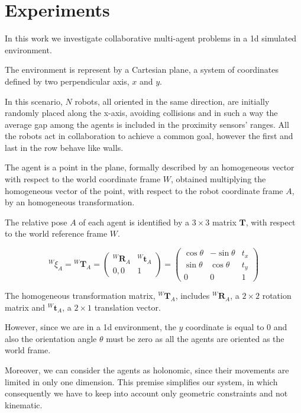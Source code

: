 \chapter{Experiments}
\label{chap:experiments}


In this work we investigate collaborative multi-agent problems in a \gls{1d} 
simulated environment.

The environment is represent by a Cartesian plane, a system of coordinates
defined by two perpendicular axis, $x$ and $y$. 

In this scenario, $N$ robots, all oriented in the same direction, are initially 
randomly placed along the x-axis, avoiding collisions and in such a way the 
average gap among the agents is included in the proximity sensors' ranges. 
All the robots act in collaboration to achieve a common goal, however the first 
and last in the row behave like walls. %

The agent is a point in the plane, formally described by an homogeneous vector 
with respect to the world coordinate frame $W$, obtained multiplying the 
homogeneous vector of the point, with respect to the robot coordinate frame 
$A$, by an homogeneous transformation. 

The relative pose $A$ of each agent is identified by a $3 \times 3$ matrix 
$\mathbf{T}$, with respect to the world reference frame $W$. 

\begin{Equation}[!htb]
	\centering
	\begin{equation}
	\label{eq:homogeneous transformation matrix}
	{^W\!\xi_A} = {^W\!\mathbf{T}_A} 
	=
	\begin{pmatrix}
	^W\!\mathbf{R}_A & ^W\!\mathbf{t}_A\\
	0, 0 & 1
	\end{pmatrix}
	=
	\begin{pmatrix}
	\cos \theta & - \sin \theta & t_x\\
	\sin \theta & \cos \theta & t_y\\
	0 & 0 & 1
	\end{pmatrix}
	\end{equation}
	\caption[Homogeneous Transformation Matrix]{The homogeneous 
	transformation matrix, 	$^W\!\mathbf{T}_A$, includes $^W\!\mathbf{R}_A$, a 
	$2 \times 2$ rotation matrix and $^W\!\mathbf{t}_A$, a $2 \times 1$ 
	translation vector.}
	\label{eq:hommatrix}
\end{Equation}

However, since we are in a \gls{1d} environment, the $y$ coordinate is equal 
to $0$ and also the orientation angle $\theta$ must be zero as all the agents are 
oriented as the world frame. 

Moreover, we can consider the agents as holonomic, since their movements are 
limited in only one dimension. This premise simplifies our system, in which 
consequently we have to keep into account only geometric constraints and not
kinematic.



